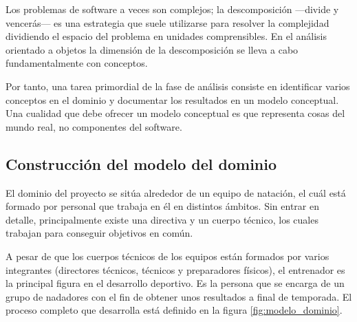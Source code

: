 	Los problemas de software a veces son complejos; la descomposición ---divide y vencerás--- es una estrategia que suele utilizarse para resolver la complejidad dividiendo el espacio del problema en unidades comprensibles. En el análisis orientado a objetos la dimensión de la descomposición se lleva a cabo fundamentalmente con conceptos.
		
	Por tanto, una tarea primordial de la fase de análisis consiste en identificar varios conceptos en el dominio y documentar los resultados en un modelo conceptual. Una cualidad que debe ofrecer un modelo conceptual es que representa cosas del mundo real, no componentes del software.
	

%
%
\subsection{Construcción del modelo del dominio} %
	\label{sub:construccion_del_modelo_del_dominio}

	El dominio del proyecto se sitúa alrededor de un equipo de natación, el cuál está formado por personal que trabaja en él en distintos ámbitos. Sin entrar en detalle, principalmente existe una directiva y un cuerpo técnico, los cuales trabajan para conseguir objetivos en común.  
	
	 A pesar de que los cuerpos técnicos de los equipos están formados por varios integrantes (directores técnicos, técnicos y preparadores físicos), el entrenador es la principal figura en el desarrollo deportivo. Es la persona que se encarga de un grupo de nadadores con el fin de obtener unos resultados a final de temporada. El proceso completo que desarrolla está definido en la figura \ref{fig:modelo_dominio}.
	
